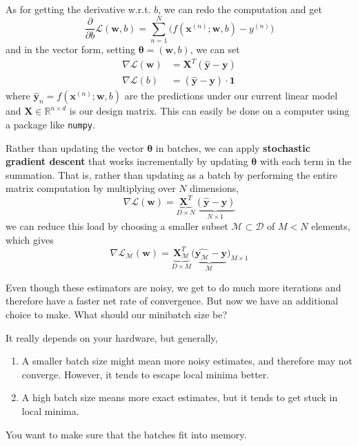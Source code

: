 \begin{example}
\begin{align}
    \end{align}
    As for getting the derivative w.r.t. $b$, we can redo the computation and get 
    \begin{equation}
      \frac{\partial}{\partial b}\mathcal{L}(\mathbf{w}, b) = \sum_{n=1}^N \big( f (\mathbf{x}^{(n)}; \mathbf{w}, b) - y^{(n)}\big) 
    \end{equation}
    and in the vector form, setting $\boldsymbol{\theta} = (\mathbf{w}, b)$, we can set 
    \begin{align}
      \nabla \mathcal{L} (\mathbf{w}) & = \mathbf{X}^T (\hat{\mathbf{y}} - \mathbf{y}) \\
      \nabla \mathcal{L} (b) & = (\hat{\mathbf{y}} - \mathbf{y}) \cdot \mathbf{1}
    \end{align}
    where $\hat{\mathbf{y}}_n = f(\mathbf{x}^{(n)}; \mathbf{w}, b)$ are the predictions under our current linear model and $\mathbf{X} \in \mathbb{R}^{n \times d}$ is our design matrix. This can easily be done on a computer using a package like \texttt{numpy}. 
    
    Rather than updating the vector $\boldsymbol{\theta}$ in batches, we can apply \textbf{stochastic gradient descent} that works incrementally by updating $\boldsymbol{\theta}$ with each term in the summation. That is, rather than updating as a batch by performing the entire matrix computation by multiplying over $N$ dimensions,
    \begin{equation}
      \nabla \mathcal{L} (\mathbf{w}) = \underbrace{\mathbf{X}^T}_{D \times N} \underbrace{(\hat{\mathbf{y}} - \mathbf{y})}_{N \times 1}
    \end{equation}
    we can reduce this load by choosing a smaller subset $\mathcal{M} \subset \mathcal{D}$ of $M < N$ elements, which gives 
    \begin{equation}
      \nabla \mathcal{L}_{\mathcal{M}} (\mathbf{w}) = \underbrace{\mathbf{X}_{\mathcal{M}}^T}_{D \times M} \underbrace{(\hat{\mathbf{y}_{\mathcal{M}}} - \mathbf{y}}_{\mathcal{M}})_{M \times 1}
    \end{equation}
  \end{example} 

  Even though these estimators are noisy, we get to do much more iterations and therefore have a faster net rate of convergence. But now we have an additional choice to make. What should our minibatch size be? 

  \begin{heuristic} 
    It really depends on your hardware, but generally, 
    \begin{enumerate}
      \item A smaller batch size might mean more noisy estimates, and therefore may not converge. However, it tends to escape local minima better. 
      \item A high batch size means more exact estimates, but it tends to get stuck in local minima.  
    \end{enumerate}
    You want to make sure that the batches fit into memory. 
  \end{heuristic}

